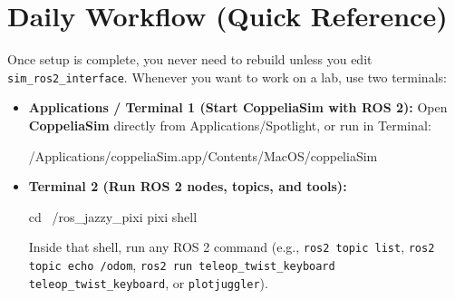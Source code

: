 \documentclass[11pt,a4paper]{article}
\begin{document}
\section{Daily Workflow (Quick Reference)}

Once setup is complete, you never need to rebuild unless you edit \texttt{sim\_ros2\_interface}. Whenever you want to work on a lab, use two terminals:

\begin{itemize}[leftmargin=1.5em]
  \item \textbf{Applications / Terminal 1 (Start CoppeliaSim with ROS 2):}
  Open \textbf{CoppeliaSim} directly from Applications/Spotlight, or run in Terminal:
\begin{cmdbox}
/Applications/coppeliaSim.app/Contents/MacOS/coppeliaSim
\end{cmdbox}
  \item \textbf{Terminal 2 (Run ROS 2 nodes, topics, and tools):}
\begin{cmdbox}
cd ~/ros_jazzy_pixi
pixi shell
\end{cmdbox}
  Inside that shell, run any ROS 2 command (e.g., \texttt{ros2 topic list}, \texttt{ros2 topic echo /odom}, \texttt{ros2 run teleop\_twist\_keyboard teleop\_twist\_keyboard}, or \texttt{plotjuggler}).
\end{itemize}
\end{document}
